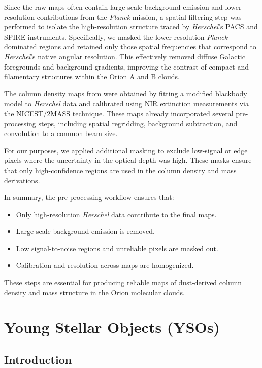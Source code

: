 Since the raw maps often contain large-scale background emission and lower-resolution contributions from the \textit{Planck} mission, a spatial filtering step was performed to isolate the high-resolution structure traced by \textit{Herschel}'s PACS and SPIRE instruments. Specifically, we masked the lower-resolution \textit{Planck}-dominated regions and retained only those spatial frequencies that correspond to \textit{Herschel}'s native angular resolution. This effectively removed diffuse Galactic foregrounds and background gradients, improving the contrast of compact and filamentary structures within the Orion A and B clouds.

The column density maps from \cite{lombardi2014herschel} were obtained by fitting a modified blackbody model to \textit{Herschel} data and calibrated using NIR extinction measurements via the NICEST/2MASS technique. These maps already incorporated several pre-processing steps, including spatial regridding, background subtraction, and convolution to a common beam size.

For our purposes, we applied additional masking to exclude low-signal or edge pixels where the uncertainty in the optical depth was high. These masks ensure that only high-confidence regions are used in the column density and mass derivations.

In summary, the pre-processing workflow ensures that:
\begin{itemize}
    \item Only high-resolution \textit{Herschel} data contribute to the final maps.
    \item Large-scale background emission is removed.
    \item Low signal-to-noise regions and unreliable pixels are masked out.
    \item Calibration and resolution across maps are homogenized.
\end{itemize}

These steps are essential for producing reliable maps of dust-derived column density and mass structure in the Orion molecular clouds.

\section{Young Stellar Objects (YSOs)}

\subsection{Introduction}

